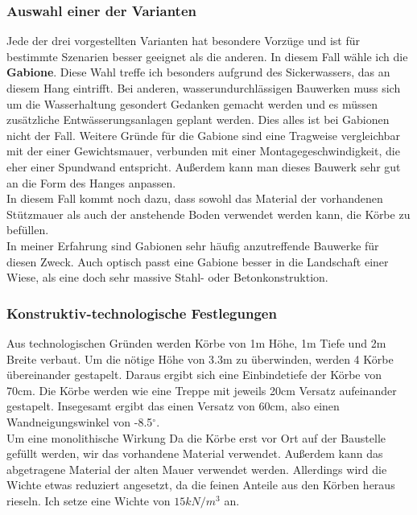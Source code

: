 \documentclass[11pt,fleqn,a4paper]{article}
\begin{document}
\subsubsection*{Auswahl einer der Varianten}
Jede der drei vorgestellten Varianten hat besondere Vorzüge und ist für bestimmte Szenarien besser geeignet als die anderen. In diesem Fall wähle ich die \textbf{Gabione}. Diese Wahl treffe ich besonders aufgrund des Sickerwassers, das an diesem Hang eintrifft. Bei anderen, wasserundurchlässigen Bauwerken muss sich um die Wasserhaltung gesondert Gedanken gemacht werden und es müssen zusätzliche Entwässerungsanlagen geplant werden. Dies alles ist bei Gabionen nicht der Fall. Weitere Gründe für die Gabione sind eine Tragweise vergleichbar mit der einer Gewichtsmauer, verbunden mit einer Montagegeschwindigkeit, die eher einer Spundwand entspricht. Außerdem kann man dieses Bauwerk sehr gut an die Form des Hanges anpassen. \\
In diesem Fall kommt noch dazu, dass sowohl das Material der vorhandenen Stützmauer als auch der anstehende Boden verwendet werden kann, die Körbe zu befüllen. \\
In meiner Erfahrung sind Gabionen sehr häufig anzutreffende Bauwerke für diesen Zweck. Auch optisch passt eine Gabione besser in die Landschaft einer Wiese, als eine doch sehr massive Stahl- oder Betonkonstruktion.
\subsubsection*{Konstruktiv-technologische Festlegungen}
Aus technologischen Gründen werden Körbe von 1m Höhe, 1m Tiefe und 2m Breite verbaut. Um die nötige Höhe von 3.3m zu überwinden, werden 4 Körbe übereinander gestapelt. Daraus ergibt sich eine Einbindetiefe der Körbe von 70cm. Die Körbe werden wie eine Treppe mit jeweils 20cm Versatz aufeinander gestapelt. Insegesamt ergibt das einen Versatz von 60cm, also einen Wandneigungswinkel von -8.5$^\circ$.\\
Um eine monolithische Wirkung 
Da die Körbe erst vor Ort auf der Baustelle gefüllt werden, wir das vorhandene Material verwendet. Außerdem kann das abgetragene Material der alten Mauer verwendet werden. Allerdings wird die Wichte etwas reduziert angesetzt, da die feinen Anteile aus den Körben heraus rieseln. Ich setze eine Wichte von $15kN/m^3$ an. 
\newpage
\end{document}
